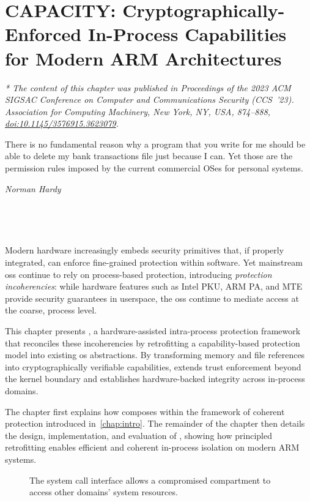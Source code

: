 %
\chapter{CAPACITY: Cryptographically-Enforced In-Process Capabilities for Modern ARM Architectures}\label{chap:capacity}

\emph{* The content of this chapter was published in Proceedings of the 2023 ACM SIGSAC Conference on Computer and Communications Security (CCS~'23). Association for Computing Machinery, New York, NY, USA, 874–888, \href{https://doi.org/10.1145/3576915.3623079}{doi:10.1145/3576915.3623079}.}
\\

\epigraph{
	There is no fundamental reason why a program that you write for me should be able to delete my bank transactions file just because I can. Yet those are the permission rules imposed by the current commercial OSes for personal systems.
}{\textit{Norman Hardy}}

\

\

\clearpage

Modern hardware increasingly embeds security primitives that, if properly integrated, can enforce fine-grained protection within software.
Yet mainstream \glspl{os} continue to rely on process-based protection, introducing \emph{protection incoherencies}: while hardware features such as Intel PKU, ARM PA, and MTE provide security guarantees in userspace, the \glspl{os} continue to mediate access at the coarse, process level.

This chapter presents \capacity, a hardware-assisted intra-process protection framework that reconciles these incoherencies by retrofitting a capability-based protection model into existing \gls{os} abstractions.
By transforming memory and file references into cryptographically verifiable capabilities, \capacity extends trust enforcement beyond the kernel boundary and establishes hardware-backed integrity across in-process domains.

The chapter first explains how \capacity composes within the framework of coherent protection introduced in~\cref{chap:intro}.
The remainder of the chapter then details the design, implementation, and evaluation of \capacity, showing how principled retrofitting enables efficient and coherent in-process isolation on modern ARM systems.

\clearpage

\begin{figure}[t]
	\centering

	\caption{The system call interface allows a compromised compartment to access other domains' system resources.}\label{ipi-misalignment}
\end{figure}

